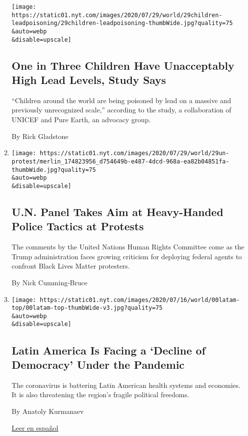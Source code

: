 \begin{enumerate}
  \texttt{[image: https://static01.nyt.com/images/2020/07/29/world/29children-leadpoisoning/29children-leadpoisoning-thumbWide.jpg?quality=75\\\&auto=webp\\\&disable=upscale]}

  \hypertarget{one-in-three-children-have-unacceptably-high-lead-levels-study-says}{%
  \subsection{One in Three Children Have Unacceptably High Lead Levels,
  Study
  Says}\label{one-in-three-children-have-unacceptably-high-lead-levels-study-says}}

  ``Children around the world are being poisoned by lead on a massive
  and previously unrecognized scale,'' according to the study, a
  collaboration of UNICEF and Pure Earth, an advocacy group.

  By Rick Gladstone
\item
  \href{/2020/07/29/world/americas/united-nations-portland-protests.html}{}

  \texttt{[image: https://static01.nyt.com/images/2020/07/29/world/29un-protest/merlin\_174823956\_d754649b-e487-4dcd-968a-ea82b04851fa-thumbWide.jpg?quality=75\\\&auto=webp\\\&disable=upscale]}

  \hypertarget{un-panel-takes-aim-at-heavy-handed-police-tactics-at-protests}{%
  \subsection{U.N. Panel Takes Aim at Heavy-Handed Police Tactics at
  Protests}\label{un-panel-takes-aim-at-heavy-handed-police-tactics-at-protests}}

  The comments by the United Nations Human Rights Committee come as the
  Trump administration faces growing criticism for deploying federal
  agents to confront Black Lives Matter protesters.

  By Nick Cumming-Bruce
\item
  \href{/2020/07/29/world/americas/latin-america-democracy-pandemic.html}{}

  \texttt{[image: https://static01.nyt.com/images/2020/07/16/world/00latam-top/00latam-top-thumbWide-v3.jpg?quality=75\\\&auto=webp\\\&disable=upscale]}

  \hypertarget{latin-america-is-facing-a-decline-of-democracy-under-the-pandemic}{%
  \subsection{Latin America Is Facing a `Decline of Democracy' Under the
  Pandemic}\label{latin-america-is-facing-a-decline-of-democracy-under-the-pandemic}}

  The coronavirus is battering Latin American health systems and
  economies. It is also threatening the region's fragile political
  freedoms.

  By Anatoly Kurmanaev

  \href{https://www.nytimes.com/es/2020/07/29/espanol/america-latina/democracia-america-latina-pandemia.html}{Leer
  en español}
\end{enumerate}

